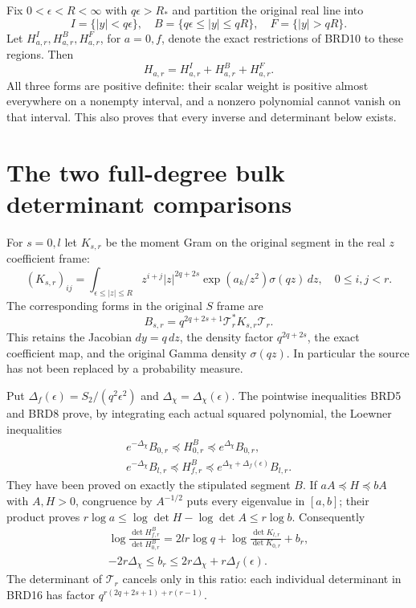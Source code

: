 Fix $0<\epsilon<R<\infty$ with $q\epsilon>R_*$ and partition
the original real line into
\[
 I=\{|y|<q\epsilon\},\quad
 B=\{q\epsilon\leq|y|\leq qR\},\quad
 F=\{|y|>qR\}.
\tag{BRD13}
\]
Let $H_{a,r}^I,H_{a,r}^B,H_{a,r}^F$, for $a=0,f$, denote
the exact restrictions of BRD10 to these regions. Then
\[
 H_{a,r}=H_{a,r}^I+H_{a,r}^B+H_{a,r}^F.\tag{BRD14}
\]
All three forms are positive definite: their scalar weight is
positive almost everywhere on a nonempty interval, and a nonzero
polynomial cannot vanish on that interval. This also proves that
every inverse and determinant below exists.

\section{The two full-degree bulk determinant comparisons}

For $s=0,l$ let $K_{s,r}$ be the moment Gram on the original
segment in the real $z$ coefficient frame:
\[
 (K_{s,r})_{ij}=\int_{\epsilon\leq|z|\leq R}
 z^{i+j}|z|^{2q+2s}\exp(a_k/z^2)\sigma(qz)\,dz,
 \quad 0\leq i,j<r.
\tag{BRD15}
\]
The corresponding forms in the original $S$ frame are
\[
 B_{s,r}=q^{2q+2s+1}\mathcal T_r^*K_{s,r}\mathcal T_r.
\tag{BRD16}
\]
This retains the Jacobian $dy=q\,dz$, the density factor
$q^{2q+2s}$, the exact coefficient map, and the original Gamma
density $\sigma(qz)$. In particular the source has not been
replaced by a probability measure.

Put $\Delta_f(\epsilon)=S_2/(q^2\epsilon^2)$ and
$\Delta_\chi=\Delta_\chi(\epsilon)$. The pointwise inequalities
BRD5 and BRD8 prove, by integrating each actual squared
polynomial, the Loewner inequalities
\[
\begin{gathered}
 e^{-\Delta_\chi}B_{0,r}\preceq H_{0,r}^B
                    \preceq e^{\Delta_\chi}B_{0,r},\\
 e^{-\Delta_\chi}B_{l,r}\preceq H_{f,r}^B
                    \preceq e^{\Delta_\chi+\Delta_f(\epsilon)}B_{l,r}.
\end{gathered}\tag{BRD17}
\]
They have been proved on exactly the stipulated segment $B$.
If $aA\preceq H\preceq bA$ with $A,H>0$, congruence by
$A^{-1/2}$ puts every eigenvalue in $[a,b]$; their product
proves $r\log a\leq\log\det H-\log\det A\leq r\log b$.
Consequently
\[
\begin{gathered}
 \log\frac{\det H_{f,r}^B}{\det H_{0,r}^B}
   =2lr\log q+\log\frac{\det K_{l,r}}{\det K_{0,r}}
                       +b_r,\\
 -2r\Delta_\chi\leq b_r
          \leq2r\Delta_\chi+r\Delta_f(\epsilon).
\end{gathered}\tag{BRD18}
\]
The determinant of $\mathcal T_r$ cancels only in this ratio:
each individual determinant in BRD16 has factor
$q^{r(2q+2s+1)+r(r-1)}$.

